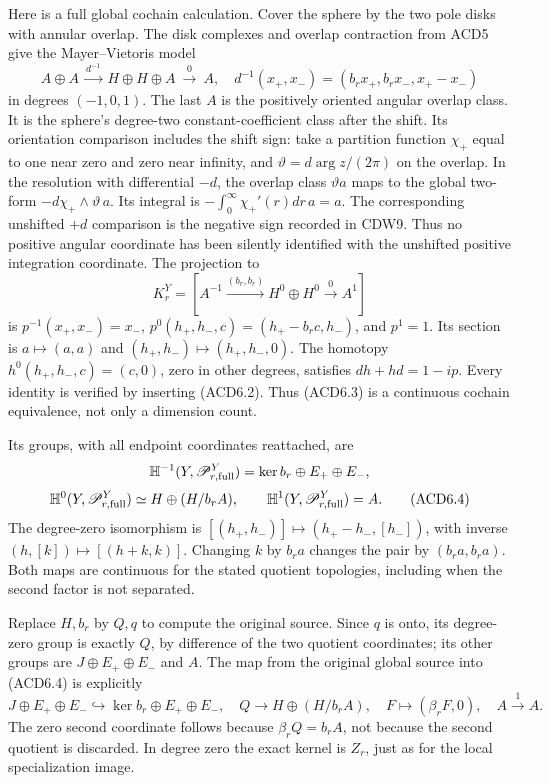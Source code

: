 Here is a full global cochain calculation. Cover the sphere by the two
pole disks with annular overlap. The disk complexes and overlap
contraction from ACD5 give the Mayer--Vietoris model \[
A\oplus A\ \xrightarrow{d^{-1}}\ H\oplus H\oplus A
\ \xrightarrow{0}\ A,
\quad d^{-1}(x_+,x_-)=(b_rx_+,b_rx_-,x_+-x_-)
\tag{ACD6.2}
\] in degrees \((-1,0,1)\). The last \(A\) is the positively oriented
angular overlap class. It is the sphere's degree-two
constant-coefficient class after the shift. Its orientation comparison
includes the shift sign: take a partition function \(\chi_+\) equal to
one near zero and zero near infinity, and \(\vartheta=d\arg z/(2\pi)\)
on the overlap. In the resolution with differential \(-d\), the overlap
class \(\vartheta a\) maps to the global two-form
\(-d\chi_+\wedge\vartheta\,a\). Its integral is
\(-\int_0^\infty\chi_+'(r)dr\,a=a\). The corresponding unshifted \(+d\)
comparison is the negative sign recorded in CDW9. Thus no positive
angular coordinate has been silently identified with the unshifted
positive integration coordinate. The projection to \[
K_r^Y=[A^{-1}\xrightarrow{(b_r,b_r)}H^0\oplus H^0
\xrightarrow{0}A^1]
\tag{ACD6.3}
\] is \(p^{-1}(x_+,x_-)=x_-\), \(p^0(h_+,h_-,c)=(h_+-b_rc,h_-)\), and
\(p^1=1\). Its section is \(a\mapsto(a,a)\) and
\((h_+,h_-)\mapsto(h_+,h_-,0)\). The homotopy \(h^0(h_+,h_-,c)=(c,0)\),
zero in other degrees, satisfies \(dh+hd=1-ip\). Every identity is
verified by inserting (ACD6.2). Thus (ACD6.3) is a continuous cochain
equivalence, not only a dimension count.

Its groups, with all endpoint coordinates reattached, are \[
\mathbb H^{-1}(Y,\mathscr P_{r,\rm full}^Y)
=\ker b_r\oplus E_+\oplus E_-,
\] \[
\mathbb H^0(Y,\mathscr P_{r,\rm full}^Y)
\simeq H\oplus(H/b_rA),\qquad
\mathbb H^1(Y,\mathscr P_{r,\rm full}^Y)=A.
\tag{ACD6.4}
\] The degree-zero isomorphism is \([(h_+,h_-)]\mapsto(h_+-h_-,[h_-])\),
with inverse \((h,[k])\mapsto[(h+k,k)]\). Changing \(k\) by \(b_ra\)
changes the pair by \((b_ra,b_ra)\). Both maps are continuous for the
stated quotient topologies, including when the second factor is not
separated.

Replace \(H,b_r\) by \(Q,q\) to compute the original source. Since \(q\)
is onto, its degree-zero group is exactly \(Q\), by difference of the
two quotient coordinates; its other groups are \(J\oplus E_+\oplus E_-\)
and \(A\). The map from the original global source into (ACD6.4) is
explicitly \[
J\oplus E_+\oplus E_-\hookrightarrow\ker b_r\oplus E_+\oplus E_-,
\quad Q\to H\oplus(H/b_rA),\quad F\mapsto(\beta_rF,0),
\quad A\xrightarrow{1}A.
\tag{ACD6.5}
\] The zero second coordinate follows because \(\beta_rQ=b_rA\), not
because the second quotient is discarded. In degree zero the exact
kernel is \(Z_r\), just as for the local specialization image.

